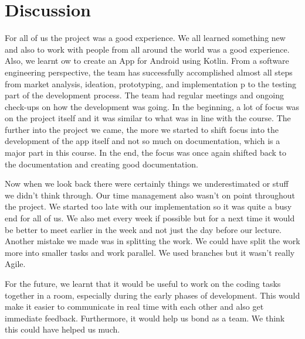 \documentclass[conference]{IEEEtran}
\begin{document}
\section{Discussion}
\par For all of us the project was a good experience. We all learned something new and also to work with people from all around the world was a good experience. Also, we learnt ow to create an App for Android using Kotlin. From a software engineering perspective, the team has successfully accomplished almost all steps  from market analysis, ideation, prototyping, and implementation p to the testing part of the development process. The team had regular meetings and ongoing check-ups on how the development was going. In the beginning, a lot of focus was on the project itself and it was similar to what was in line with the course. The further into the project we came, the more we started to shift focus into the development of the app itself and not so much on documentation, which is a major part in this course. In the end, the focus was once again shifted back to the documentation and creating good documentation. 
\par Now when we look back there were certainly things we underestimated or stuff we didn’t think through. Our time management also wasn’t on point throughout the project. We started too late with our implementation so it was quite a busy end for all of us. We also met every week if possible but for a next time it would be better to meet earlier in the week and not just the day before our lecture. Another mistake we made was in splitting the work. We could have split the work more into smaller tasks and work parallel. We used branches but it wasn’t really Agile.
\par For the future, we learnt that it would be useful to work on the coding tasks together in a room, especially during the early phases of development. This would make it easier to communicate in real time with each other and also get immediate feedback. Furthermore, it would help us bond as a team. We think this could have helped us much.
\end{document}
